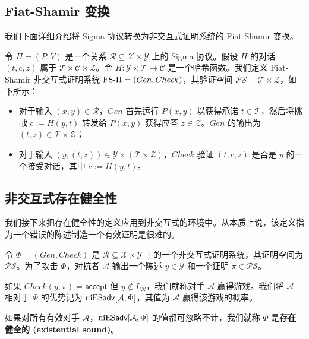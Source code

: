 \subsection{Fiat-Shamir 变换}

我们下面详细介绍将 Sigma 协议转换为非交互式证明系统的 Fiat-Shamir 变换。

令 $\Pi=(P,V)$ 是一个关系 $\mathcal{R}\subseteq\mathcal{X}\times\mathcal{Y}$ 上的 Sigma 协议。假设 $\Pi$ 的对话 $(t,c,z)$ 属于 $\mathcal{T}\times\mathcal{C}\times\mathcal{Z}$。令 $H:\mathcal{Y}\times\mathcal{T}\to\mathcal{C}$ 是一个哈希函数。我们定义 Fiat-Shamir 非交互式证明系统 ${\rm FS}\text{-}\Pi=(Gen,Check)$，其验证空间 $\mathcal{PS}=\mathcal{T}\times\mathcal{Z}$，如下所示：
\begin{itemize}
	\item 对于输入 $(x,y)\in\mathcal{R}$，$Gen$ 首先运行 $P(x,y)$ 以获得承诺 $t\in\mathcal{T}$，然后将挑战 $c:=H(y,t)$ 转发给 $P(x,y)$ 获得应答 $z\in\mathcal{Z}$。$Gen$ 的输出为 $(t,z)\in\mathcal{T}\times\mathcal{Z}$；
	\item 对于输入 $(y,(t,z))\in\mathcal{Y}\times(\mathcal{T}\times\mathcal{Z})$，$Check$ 验证 $(t,c,z)$ 是否是 $y$ 的一个接受对话，其中 $c:=H(y,t)$。
\end{itemize}

\subsection{非交互式存在健全性}

我们接下来把存在健全性的定义应用到非交互式的环境中。从本质上说，该定义指为一个错误的陈述制造一个有效证明是很难的。

\begin{game}[非交互式存在健全性]\label{game:20-2}
令 $\Phi=(Gen,Check)$ 是 $\mathcal{R}\subseteq\mathcal{X}\times\mathcal{Y}$ 上的一个非交互式证明系统，其证明空间为 $\mathcal{PS}$。为了攻击 $\Phi$，对抗者 $\mathcal{A}$ 输出一个陈述 $y\in\mathcal{Y}$ 和一个证明 $\pi\in\mathcal{PS}$。

如果 $Check(y,\pi)=\mathsf{accept}$ 但 $y\notin L_{\mathcal R}$，我们就称对手 $\mathcal A$ 赢得游戏。我们将 $\mathcal{A}$ 相对于 $\Phi$ 的优势记为 ${\rm niES\mathsf{adv}}[\mathcal{A},\Phi]$，其值为 $\mathcal{A}$ 赢得该游戏的概率。
\end{game}

\begin{definition}
如果对所有有效对手 $\mathcal{A}$，${\rm niES\mathsf{adv}}[\mathcal{A},\Phi]$ 的值都可忽略不计，我们就称 $\Phi$ 是\textbf{存在健全的 (existential sound)}。
\end{definition}

